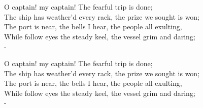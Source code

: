 \documentclass{article}
\begin{document}
\bgroup
\poemlinenumsfalse
\begin{poem}
O captain! my captain! The fearful trip is done; \\
\poemlinenumstrue
The ship has weather’d every rack, the prize we sought is won;\\
The port is near, the bells I hear, the people all exulting, \\
While follow eyes the steady keel, the vessel grim and daring; \\-
\end{poem}
\egroup

\bgroup
\poemlinenumrighttrue
\setcounter{poemlinenumsevery}{1}
\titleauthorpoem{\poemblanktitle}{\poemblankauthor}
\begin{poem}
O captain! my captain! The fearful trip is done; \\
\poemlinenumrightfalse
The ship has weather’d every rack, the prize we sought is won;\\
The port is near, the bells I hear, the people all exulting, \\
While follow eyes the steady keel, the vessel grim and daring; \\-
\end{poem}
\egroup
\end{document}
